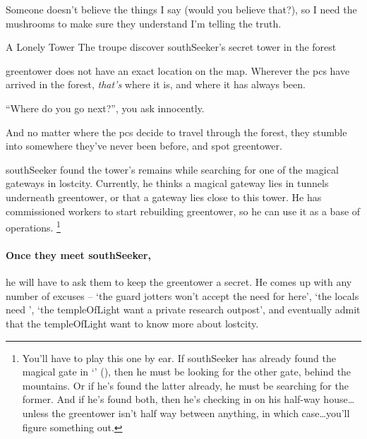 \begin{speechtext}
  Someone doesn't believe the things I say (would you believe that?), so I need the mushrooms to make sure they understand I'm telling the truth.
\end{speechtext}

{A Lonely Tower}%
{The troupe discover \gls{southSeeker}'s secret tower in the forest}%


\Gls{greentower} does not have an exact location on the map.
Wherever the \glspl{pc} have arrived in the forest, \textit{that's} where it is, and where it has always been.

``Where do you go next?'', you ask innocently.

And no matter where the \glspl{pc} decide to travel through the forest, they stumble into somewhere they've never been before, and spot \gls{greentower}.

\begin{exampletext}
  \Gls{southSeeker} found the tower's remains while searching for one of the magical gateways in \gls{lostcity}.
  Currently, he thinks a magical gateway lies in tunnels underneath \gls{greentower}, or that a gateway lies close to this tower.
  He has commissioned workers to start rebuilding \gls{greentower}, so he can use it as a base of operations.%
  \footnote{You'll have to play this one by ear.
  If \gls{southSeeker} has already found the magical gate in `' (), then he must be looking for the other gate, behind the mountains.
  Or if he's found the latter already, he must be searching for the former.
  And if he's found both, then he's checking in on his half-way house\ldots unless the \gls{greentower} isn't half way between anything, in which case\ldots you'll figure something out.}

\end{exampletext}

\paragraph{Once they meet \gls{southSeeker},}
he will have to ask them to keep the \gls{greentower} a secret.
He comes up with any number of excuses -- `the \gls{guard} \glspl{jotter} won't accept the need for  here', `the locals need ', `the \gls{templeOfLight} want a private research outpost', and eventually admit that the \gls{templeOfLight} want to know more about \gls{lostcity}.

